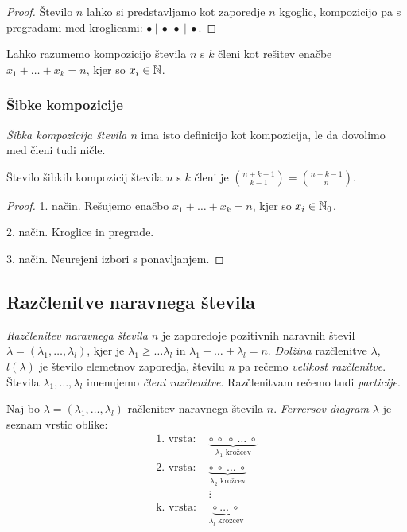 \begin{proof}
    Število $n$ lahko si predstavljamo kot zaporedje $n$ kgoglic, kompozicijo pa s pregradami med kroglicami: $\bullet~|~\bullet~\bullet~|~\bullet$.
\end{proof}

\begin{opomba}
    Lahko razumemo kompozicijo števila $n$ s $k$ členi kot rešitev enačbe $x_1 + \ldots + x_k = n$, kjer so $x_i \in \mathbb{N}$.
\end{opomba}

\subsubsection{Šibke kompozicije}
\emph{Šibka kompozicija števila $n$} ima isto definicijo kot kompozicija, le da dovolimo med členi tudi ničle.

\begin{trditev}
    Število šibkih kompozicij števila $n$ s $k$ členi je $\binom{n+k-1}{k-1} = \binom{n+k-1}{n}$.
\end{trditev}

\begin{proof}
    1. način. Rešujemo enačbo $x_1 + \ldots + x_k = n$, kjer so $x_i \in \mathbb{N}_0$.

    2. način. Kroglice in pregrade.

    3. način. Neurejeni izbori s ponavljanjem.
\end{proof}

\subsection{Razčlenitve naravnega števila}
\begin{definicija}
    \emph{Razčlenitev naravnega števila $n$} je zaporedoje pozitivnih naravnih števil $\lambda = (\lambda_1, \ldots, \lambda_l)$, kjer je $\lambda_1 \geq \ldots \lambda_l$ in $\lambda_1 + \ldots + \lambda_l = n$. \emph{Dolžina} razčlenitve $\lambda$, $l(\lambda)$ je število elemetnov zaporedja, številu $n$ pa rečemo \emph{velikost razčlenitve}. Števila $\lambda_1, \ldots, \lambda_l$ imenujemo \emph{členi razčlenitve}. Razčlenitvam rečemo tudi \emph{particije}.
\end{definicija}

\begin{definicija}
    Naj bo $\lambda = (\lambda_1, \ldots, \lambda_l)$ račlenitev naravnega števila $n$. \emph{Ferrersov diagram $\lambda$} je seznam vrstic oblike:
    \begin{align*}
        \text{1. vrsta: } &\underbrace{\circ \ \circ \ \circ \ \ldots \ \circ}_{\lambda_1 \text{ krožcev}} \\
        \text{2. vrsta: } &\underbrace{\circ \ \circ \ \ldots \ \circ}_{\lambda_2 \text{ krožcev}} \\
        &\vdots \\
        \text{k. vrsta: } &\underbrace{\circ \ \ldots \ \circ}_{\lambda_l \text{ krožcev}}
    \end{align*}
\end{definicija}

